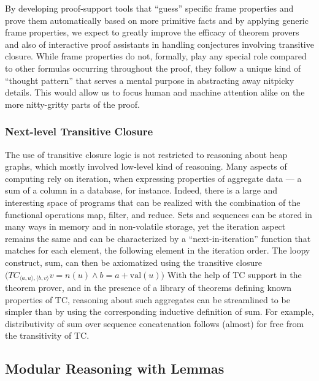 By developing proof-support tools that ``guess'' specific frame properties
and prove them automatically based on more primitive facts and by applying
generic frame properties, we expect to greatly improve the efficacy of theorem
provers and also of interactive proof assistants in handling conjectures
involving transitive closure.
While frame properties do not, formally, play any special role compared to
other formulas occurring throughout the proof, they follow a unique kind of
``thought pattern'' that serves a mental purpose in abstracting away nitpicky
details.
This would allow us to focus human and machine attention alike on the more
nitty-gritty parts of the proof.

\subsubsection{Next-level Transitive Closure}

The use of transitive closure logic is not restricted to reasoning about heap
graphs, which mostly involved low-level kind of reasoning.
Many aspects of computing rely on iteration, \eg when expressing properties of
aggregate data --- a sum of a column in a database, for instance.
Indeed, there is a large and interesting space of programs that can be realized
with the combination of the functional operations \textsf{map}, \textsf{filter},
and \textsf{reduce}. %
Sets and sequences can be stored in many ways in memory and in non-volatile
storage, yet the iteration aspect remains the same and can be characterized by
a ``next-in-iteration'' function that matches for each element, the following
element in the iteration order.
The loopy construct, \eg sum, can then be axiomatized using the transitive
closure $\big(TC_{\langle a,u\rangle,\langle b,v\rangle}v=n(u) \land b=a+\mathrm{val}(u)\big)$
With the help of TC support in the theorem prover, and in the presence of a
library of theorems defining known properties of TC, reasoning about such
aggregates can be streamlined to be simpler than by using the corresponding
inductive definition of sum.
For example, distributivity of sum over sequence concatenation follows (almost)
for free from the transitivity of TC.



\subsection{Modular Reasoning with Lemmas}

